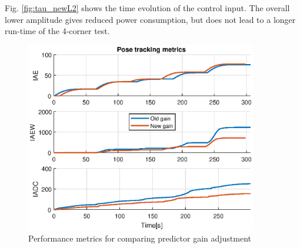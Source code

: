 Fig. \ref{fig:tau_newL2} shows the time evolution of the control input. The overall lower amplitude gives reduced power consumption, but does not lead to a longer run-time of the 4-corner test.

\begin{figure}[!h]
\centering
\includegraphics[width=0.9\textwidth]{adjustment_plots/metricimprovement.eps}
\caption{Performance metrics for comparing predictor gain adjustment}
\label{fig:metric_newL2}
\end{figure}